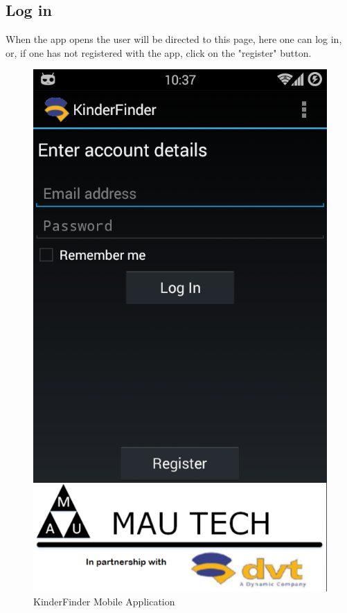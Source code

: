 \documentclass{article}
\begin{document}
\subsection{Log in}
When the app opens the user will be directed to this page, here one can log in, or, if one has not registered with the app, click on the "register" button.
\begin{figure}[H]
\centering
\includegraphics[scale=0.4]{Main App - Log In.png}
\caption{KinderFinder Mobile Application}
\end{figure}
\end{document}
